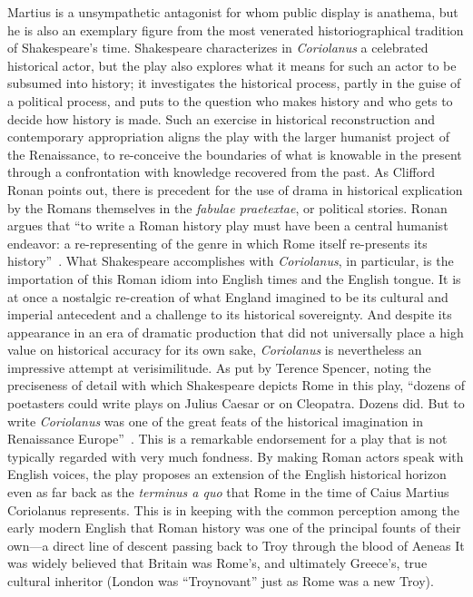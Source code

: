 Martius is a unsympathetic antagonist for whom public display is anathema, but he is also an exemplary figure from the most venerated historiographical tradition of Shakespeare's time.
Shakespeare characterizes in \emph{Coriolanus} a celebrated historical actor, but the play also explores what it means for such an actor to be subsumed into history; it investigates the historical process, partly in the guise of a political process, and puts to the question who makes history and who gets to decide how history is made.
Such an exercise in historical reconstruction and contemporary appropriation aligns the play with the larger humanist project of the Renaissance, to re-conceive the boundaries of what is knowable in the present through a confrontation with knowledge recovered from the past.
As Clifford Ronan points out, there is precedent for the use of drama in historical explication by the Romans themselves in the \emph{fabulae praetextae}, or political stories.
Ronan argues that ``to write a Roman history play must have been a central humanist endeavor: a re-representing of the genre in which Rome itself re-presents its history''~\cite[7]{ronan_antike_1995}.
What Shakespeare accomplishes with \emph{Coriolanus}, in particular, is the importation of this Roman idiom into English times and the English tongue. It is at once a nostalgic re-creation of what England imagined to be its cultural and imperial antecedent and a challenge to its historical sovereignty.
And despite its appearance in an era of dramatic production that did not universally place a high value on historical accuracy for its own sake, \emph{Coriolanus} is nevertheless an impressive attempt at verisimilitude.
As put by Terence Spencer, noting the preciseness of detail with which Shakespeare depicts Rome in this play, ``dozens of poetasters could write plays on Julius Caesar or on Cleopatra.
Dozens did.
But to write \emph{Coriolanus} was one of the great feats of the historical imagination in Renaissance Europe''~\cite[35]{spencer_shakespeare_1948}.
This is a remarkable endorsement for a play that is not typically regarded with very much fondness.
By making Roman actors speak with English voices, the play proposes an extension of the English historical horizon even as far back as the \emph{terminus a quo} that Rome in the time of Caius Martius Coriolanus represents.
This is in keeping with the common perception among the early modern English that Roman history was one of the principal founts of their own---a direct line of descent passing back to Troy through the blood of Aeneas
It was widely believed that Britain was Rome's, and ultimately Greece's, true cultural inheritor (London was ``Troynovant'' just as Rome was a new Troy).
